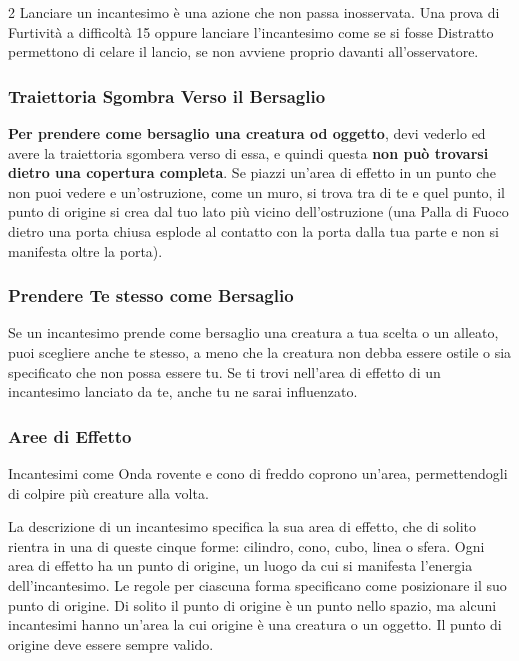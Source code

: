 \begin{multicols}{2}
Lanciare un incantesimo è una azione che non passa inosservata. Una prova di Furtività a difficoltà 15 oppure lanciare l'incantesimo come se si fosse Distratto permettono di celare il lancio, se non avviene proprio davanti all'osservatore.

\subsubsection*{Traiettoria Sgombra Verso il Bersaglio}

\textbf{Per prendere come bersaglio una creatura od oggetto}, devi vederlo ed avere la traiettoria sgombera verso di essa, e quindi questa \textbf{non può trovarsi dietro una copertura completa}. Se piazzi un'area di effetto in un punto che non puoi vedere e un'ostruzione, come un muro, si trova tra di te e quel punto, il punto di origine si crea dal tuo lato più vicino dell'ostruzione (una Palla di Fuoco dietro una porta chiusa esplode al contatto con la porta dalla tua parte e non si manifesta oltre la porta).

\subsubsection*{Prendere Te stesso come Bersaglio}

Se un incantesimo prende come bersaglio una creatura a tua scelta o un alleato, puoi scegliere anche te stesso, a meno che la creatura non debba essere ostile o sia specificato che non possa essere tu. Se ti trovi nell'area di effetto di un incantesimo lanciato da te, anche tu ne sarai influenzato.

\subsubsection{Aree di Effetto}\label{magieareedieffetto}

Incantesimi come Onda rovente e cono di freddo coprono un'area, permettendogli di colpire più creature alla volta.

La descrizione di un incantesimo specifica la sua area di effetto, che di solito rientra in una di queste cinque forme: cilindro, cono, cubo, linea o sfera. Ogni area di effetto ha un punto di origine, un luogo da cui si manifesta l'energia dell'incantesimo. Le regole per ciascuna forma specificano come posizionare il suo punto di origine. Di solito il punto di origine è un punto nello spazio, ma alcuni incantesimi hanno un'area la cui origine è una creatura o un oggetto. Il punto di origine deve essere sempre valido.


\end{multicols}
